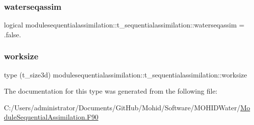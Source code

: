 \subsubsection{\texorpdfstring{waterseqassim}{waterseqassim}}
{\footnotesize\ttfamily logical modulesequentialassimilation\+::t\+\_\+sequentialassimilation\+::waterseqassim = .false.\hspace{0.3cm}{\ttfamily [private]}}

\mbox{\label{structmodulesequentialassimilation_1_1t__sequentialassimilation_a77516f639dc599681bee9849ccb83fe6}} 
\subsubsection{\texorpdfstring{worksize}{worksize}}
{\footnotesize\ttfamily type (t\+\_\+size3d) modulesequentialassimilation\+::t\+\_\+sequentialassimilation\+::worksize\hspace{0.3cm}{\ttfamily [private]}}



The documentation for this type was generated from the following file\+:\begin{DoxyCompactItemize}
\item 
C\+:/\+Users/administrator/\+Documents/\+Git\+Hub/\+Mohid/\+Software/\+M\+O\+H\+I\+D\+Water/\mbox{\hyperlink{_module_sequential_assimilation_8_f90}{Module\+Sequential\+Assimilation.\+F90}}\end{DoxyCompactItemize}
